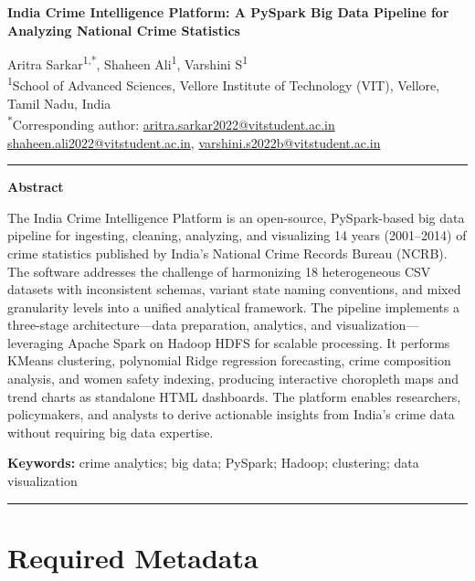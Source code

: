 \documentclass[a4paper,12pt]{article}
\begin{document}
{\LARGE\bfseries India Crime Intelligence Platform: A PySpark Big Data Pipeline for Analyzing National Crime Statistics\par}
\vspace{4pt}

{\large Aritra Sarkar\textsuperscript{1,*}, Shaheen Ali\textsuperscript{1}, Varshini S\textsuperscript{1}}\\[4pt]
{\small \textsuperscript{1}School of Advanced Sciences, Vellore Institute of Technology (VIT), Vellore, Tamil Nadu, India}\\
{\small \textsuperscript{*}Corresponding author: \href{mailto:aritra.sarkar2022@vitstudent.ac.in}{aritra.sarkar2022@vitstudent.ac.in}}\\[2pt]
{\small \href{mailto:shaheen.ali2022@vitstudent.ac.in}{shaheen.ali2022@vitstudent.ac.in}, \href{mailto:varshini.s2022b@vitstudent.ac.in}{varshini.s2022b@vitstudent.ac.in}}

\vspace{4pt}
\hrule
\vspace{4pt}

\textbf{Abstract}

The India Crime Intelligence Platform is an open-source, PySpark-based big data pipeline for ingesting, cleaning, analyzing, and visualizing 14 years (2001--2014) of crime statistics published by India's National Crime Records Bureau (NCRB). The software addresses the challenge of harmonizing 18 heterogeneous CSV datasets with inconsistent schemas, variant state naming conventions, and mixed granularity levels into a unified analytical framework. The pipeline implements a three-stage architecture---data preparation, analytics, and visualization---leveraging Apache Spark on Hadoop HDFS for scalable processing. It performs KMeans clustering, polynomial Ridge regression forecasting, crime composition analysis, and women safety indexing, producing interactive choropleth maps and trend charts as standalone HTML dashboards. The platform enables researchers, policymakers, and analysts to derive actionable insights from India's crime data without requiring big data expertise.

\textbf{Keywords:} crime analytics; big data; PySpark; Hadoop; clustering; data visualization

\vspace{4pt}
\hrule
\vspace{4pt}

\section*{Required Metadata}
\end{document}
